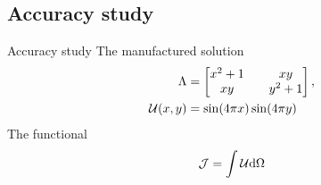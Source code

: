 \documentclass{beamer}
\begin{document}
\subsection{Accuracy study}
\begin{frame}{Accuracy study}
    The manufactured solution
    \begin{equation*}
    \begin{aligned}
    \Lambda &= \begin{bmatrix}
    x^2+1 && xy \\ xy && y^2+1
    \end{bmatrix}, \\
    \mathcal{U}(x,y) &= \sin(4\pi x)\sin(4\pi y)
    \end{aligned}
    \end{equation*}
   The functional
    \begin{equation*}
    \mathcal{J} = \int \mathcal{U} \mathrm{d} \Omega
    \end{equation*}
\end{frame}
\end{document}
